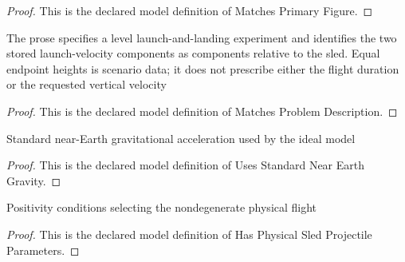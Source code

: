 \begin{proof}
  This is the declared model definition of Matches Primary Figure.
\end{proof}
\begin{definition}
  \label{def:physics:phyx-mini-0749:phyxminiproblems-problemphyxmini0749-matchesproblemdescription}
  The prose specifies a level launch-and-landing experiment and identifies the two stored launch-velocity components as components relative to the sled. Equal endpoint heights is scenario data; it does not prescribe either the flight duration or the requested vertical velocity
\end{definition}
\begin{proof}
  This is the declared model definition of Matches Problem Description.
\end{proof}
\begin{definition}
  \label{def:physics:phyx-mini-0749:phyxminiproblems-problemphyxmini0749-usesstandardnearearthgravity}
  Standard near-Earth gravitational acceleration used by the ideal model
\end{definition}
\begin{proof}
  This is the declared model definition of Uses Standard Near Earth Gravity.
\end{proof}
\begin{definition}
  \label{def:physics:phyx-mini-0749:phyxminiproblems-problemphyxmini0749-hasphysicalsledprojectileparameters}
  Positivity conditions selecting the nondegenerate physical flight
\end{definition}
\begin{proof}
  This is the declared model definition of Has Physical Sled Projectile Parameters.
\end{proof}
